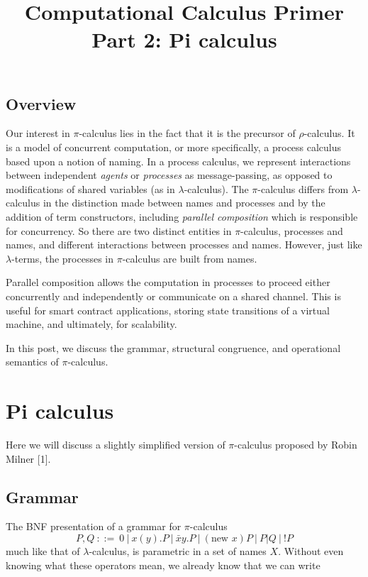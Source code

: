 \documentclass[12pt]{article}
\numberwithin{equation}{section}
\begin{document}
\author{}
\date{}
\title{Computational Calculus Primer Part 2: Pi calculus}

\maketitle

\subsection{Overview}
Our interest in $\pi$-calculus lies in the fact that it is the precursor of $\rho$-calculus. It is a model of concurrent computation, or more specifically, a process calculus based upon a notion of naming. In a process calculus, we represent interactions between independent \emph{agents} or \emph{processes} as message-passing, as opposed to modifications of shared variables (as in $\lambda$-calculus). The $\pi$-calculus differs from $\lambda$-calculus in the distinction made between names and processes and by the addition of term constructors, including \emph{parallel composition} which is responsible for concurrency. So there are two distinct entities in $\pi$-calculus, processes and names, and different interactions between processes and names. However, just like $\lambda$-terms, the processes in $\pi$-calculus are built from names.

Parallel composition allows the computation in processes to proceed either concurrently and independently or communicate on a shared channel. This is useful for smart contract applications, storing state transitions of a virtual machine, and ultimately, for scalability.

In this post, we discuss the grammar, structural congruence, and operational semantics of $\pi$-calculus.

\section{Pi calculus}
Here we will discuss a slightly simplified version of $\pi$-calculus proposed by Robin Milner [1].

\subsection{Grammar}
The BNF presentation of a grammar for $\pi$-calculus
\begin{equation} \label{pbnf}
P, Q \ ::= \ 0 \ | \ x(y).P \ | \ \bar{x} y .P \ | \ (\text{new } x)P \ | \ P|Q \ | \ !P
\end{equation}
much like that of $\lambda$-calculus, is parametric in a set of names $X$. Without even knowing what these operators mean, we already know that we can write
\end{document}
